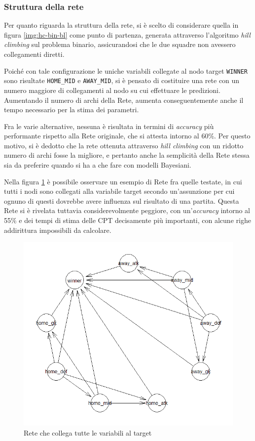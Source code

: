 \documentclass[hidelinks, 12pt]{article}
\begin{document}
\subsubsection{Struttura della rete}

Per quanto riguarda la struttura della rete, si è scelto di considerare quella in figura \ref{img:hc-bin-bl} come punto di partenza, generata attraverso l'algoritmo \textit{hill climbing} sul problema binario, assicurandosi che le due squadre non avessero collegamenti diretti.

Poiché con tale configurazione le uniche variabili collegate al nodo target \texttt{WINNER} sono risultate \texttt{HOME\_MID} e \texttt{AWAY\_MID}, si è pensato di costituire una rete con un numero maggiore di collegamenti al nodo su cui effettuare le predizioni. Aumentando il numero di archi della Rete, aumenta conseguentemente anche il tempo necessario per la stima dei parametri.

Fra le varie alternative, nessuna è risultata in termini di \textit{accuracy} più performante rispetto alla Rete originale, che si attesta intorno al 60\%. Per questo motivo, si è dedotto che la rete ottenuta attraverso \textit{hill climbing} con un ridotto numero di archi fosse la migliore, e pertanto anche la semplicità della Rete stessa sia da preferire quando si ha a che fare con modelli Bayesiani.

Nella figura \ref{fig:hc-bin-all} è possibile osservare un esempio di Rete fra quelle testate, in cui tutti i nodi sono collegati alla variabile target secondo un'assunzione per cui ognuno di questi dovrebbe avere influenza sul risultato di una partita. Questa Rete si è rivelata tuttavia considerevolmente peggiore, con un'\textit{accuracy} intorno al 55\% e dei tempi di stima delle CPT decisamente più importanti, con alcune righe addirittura impossibili da calcolare.

\begin{figure}[H]
	\centering
	\includegraphics[scale=0.8]{images/06_02_hc_bin_wl_all.png}
	\caption[Rete che collega tutte le variabili al target]{Rete che collega tutte le variabili al target}
	\label{fig:hc-bin-all}
\end{figure}
\end{document}
